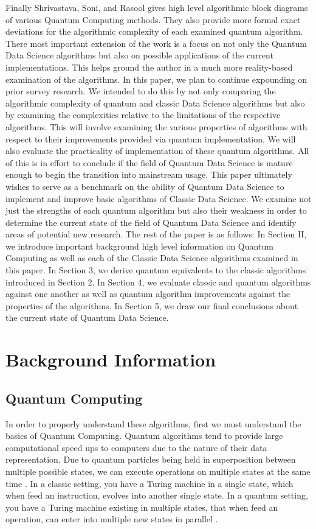 \documentclass[conference]{IEEEtran}
\begin{document}
\newline
\indent Finally Shrivastava, Soni, and Rasool gives high level algorithmic block diagrams of various Quantum Computing methods. They also provide more formal exact deviations for the algorithmic complexity of each examined quantum algorithm. There most important extension of the work is a focus on not only the Quantum Data Science algorithms but also on possible applications of the current implementations. This helps ground the author in a much more reality-based examination of the algorithms.\cite{b8}    
\newline
\indent In this paper, we plan to continue expounding on prior survey research. We intended to do this by not only comparing the algorithmic complexity of quantum and classic Data Science algorithms but also by examining the complexities relative to the limitations of the respective algorithms. This will involve examining the various properties of algorithms with respect to their improvements provided via quantum implementation. We will also evaluate the practicality of implementation of these quantum algorithms. All of this is in effort to conclude if the field of Quantum Data Science is mature enough to begin the transition into mainstream usage. 
\newline
\indent This paper ultimately wishes to serve as a benchmark on the ability of Quantum Data Science to implement and improve basic algorithms of Classic Data Science. We examine not just the strengths of each quantum algorithm but also their weakness in order to determine the current state of the field of Quantum Data Science and identify areas of potential new research. The rest of the paper is as follows: In Section II, we introduce important background high level information on Quantum Computing as well as each of the Classic Data Science algorithms examined in this paper. In Section 3, we derive quantum equivalents to the classic algorithms introduced in Section 2. In Section 4, we evaluate classic and quantum algorithms against one another as well as quantum algorithm improvements against the properties of the algorithms. In Section 5, we draw our final conclusions about the current state of Quantum Data Science.    
\section{Background Information}

\subsection{Quantum Computing}
In order to properly understand these algorithms, first we must understand the basics of Quantum Computing. Quantum algorithms tend to provide large computational speed ups to computers due to the nature of their data representation. Due to quantum particles being held in superposition between multiple possible states, we can execute operations on multiple states at the same time \cite{b5}. In a classic setting, you have a Turing machine in a single state, which when feed an instruction, evolves into another single state. In a quantum setting, you have a Turing machine existing in multiple states, that when feed an operation, can enter into multiple new states in parallel \cite{b9}.   
\end{document}
